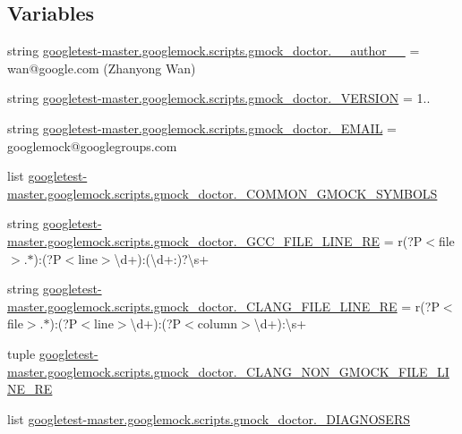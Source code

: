 \subsection*{Variables}
\begin{DoxyCompactItemize}
\item 
string \mbox{\hyperlink{namespacegoogletest-master_1_1googlemock_1_1scripts_1_1gmock__doctor_a25557db21c9badbabd387cce26bf8f82}{googletest-\/master.\+googlemock.\+scripts.\+gmock\+\_\+doctor.\+\_\+\+\_\+author\+\_\+\+\_\+}} = \textquotesingle{}wan@google.\+com (Zhanyong Wan)\textquotesingle{}
\item 
string \mbox{\hyperlink{namespacegoogletest-master_1_1googlemock_1_1scripts_1_1gmock__doctor_a58d27c674ecb09edef5074b2ae14b9a7}{googletest-\/master.\+googlemock.\+scripts.\+gmock\+\_\+doctor.\+\_\+\+V\+E\+R\+S\+I\+ON}} = \textquotesingle{}1..\textquotesingle{}
\item 
string \mbox{\hyperlink{namespacegoogletest-master_1_1googlemock_1_1scripts_1_1gmock__doctor_ac463bf700b1338cd5efc04ef90baec07}{googletest-\/master.\+googlemock.\+scripts.\+gmock\+\_\+doctor.\+\_\+\+E\+M\+A\+IL}} = \textquotesingle{}googlemock@googlegroups.\+com\textquotesingle{}
\item 
list \mbox{\hyperlink{namespacegoogletest-master_1_1googlemock_1_1scripts_1_1gmock__doctor_a84da9e9a1e618bb99545b5271b8a814c}{googletest-\/master.\+googlemock.\+scripts.\+gmock\+\_\+doctor.\+\_\+\+C\+O\+M\+M\+O\+N\+\_\+\+G\+M\+O\+C\+K\+\_\+\+S\+Y\+M\+B\+O\+LS}}
\item 
string \mbox{\hyperlink{namespacegoogletest-master_1_1googlemock_1_1scripts_1_1gmock__doctor_abb25fbe1d844d7980efa19b0bfb25dac}{googletest-\/master.\+googlemock.\+scripts.\+gmock\+\_\+doctor.\+\_\+\+G\+C\+C\+\_\+\+F\+I\+L\+E\+\_\+\+L\+I\+N\+E\+\_\+\+RE}} = r\textquotesingle{}(?P$<$file$>$.$\ast$)\+:(?P$<$line$>$\textbackslash{}d+)\+:(\textbackslash{}d+\+:)?\textbackslash{}s+\textquotesingle{}
\item 
string \mbox{\hyperlink{namespacegoogletest-master_1_1googlemock_1_1scripts_1_1gmock__doctor_ae3705af4faaeb3b450d0138a87db1fc8}{googletest-\/master.\+googlemock.\+scripts.\+gmock\+\_\+doctor.\+\_\+\+C\+L\+A\+N\+G\+\_\+\+F\+I\+L\+E\+\_\+\+L\+I\+N\+E\+\_\+\+RE}} = r\textquotesingle{}(?P$<$file$>$.$\ast$)\+:(?P$<$line$>$\textbackslash{}d+)\+:(?P$<$column$>$\textbackslash{}d+)\+:\textbackslash{}s+\textquotesingle{}
\item 
tuple \mbox{\hyperlink{namespacegoogletest-master_1_1googlemock_1_1scripts_1_1gmock__doctor_a11f2128432c289a894a5184a2f58ad5c}{googletest-\/master.\+googlemock.\+scripts.\+gmock\+\_\+doctor.\+\_\+\+C\+L\+A\+N\+G\+\_\+\+N\+O\+N\+\_\+\+G\+M\+O\+C\+K\+\_\+\+F\+I\+L\+E\+\_\+\+L\+I\+N\+E\+\_\+\+RE}}
\item 
list \mbox{\hyperlink{namespacegoogletest-master_1_1googlemock_1_1scripts_1_1gmock__doctor_a6f0e420cd9ef5e04ef716c7f03ed44bb}{googletest-\/master.\+googlemock.\+scripts.\+gmock\+\_\+doctor.\+\_\+\+D\+I\+A\+G\+N\+O\+S\+E\+RS}}
\end{DoxyCompactItemize}
